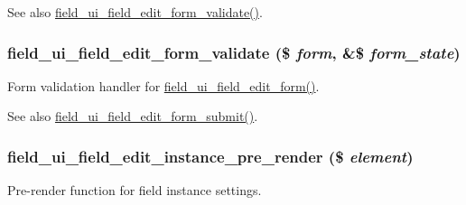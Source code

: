 \begin{DoxySeeAlso}{See also}
\hyperlink{field__ui_8admin_8inc_ae9379c6d84a3dcf100c967a8a0a0f233}{field\_\-ui\_\-field\_\-edit\_\-form\_\-validate()}. 
\end{DoxySeeAlso}
\hypertarget{field__ui_8admin_8inc_ae9379c6d84a3dcf100c967a8a0a0f233}{
\subsubsection[{field\_\-ui\_\-field\_\-edit\_\-form\_\-validate}]{\setlength{\rightskip}{0pt plus 5cm}field\_\-ui\_\-field\_\-edit\_\-form\_\-validate (\$ {\em form}, \/  \&\$ {\em form\_\-state})}}
\label{field__ui_8admin_8inc_ae9379c6d84a3dcf100c967a8a0a0f233}
Form validation handler for \hyperlink{group__forms_ga11660e91b3649ff30bf665c00f1a9af2}{field\_\-ui\_\-field\_\-edit\_\-form()}.

\begin{DoxySeeAlso}{See also}
\hyperlink{field__ui_8admin_8inc_a0d4cacca76203d4d7506dedc4781018e}{field\_\-ui\_\-field\_\-edit\_\-form\_\-submit()}. 
\end{DoxySeeAlso}
\hypertarget{field__ui_8admin_8inc_a373285bb6132ddc8934b459d5fe70f7e}{
\subsubsection[{field\_\-ui\_\-field\_\-edit\_\-instance\_\-pre\_\-render}]{\setlength{\rightskip}{0pt plus 5cm}field\_\-ui\_\-field\_\-edit\_\-instance\_\-pre\_\-render (\$ {\em element})}}
\label{field__ui_8admin_8inc_a373285bb6132ddc8934b459d5fe70f7e}
Pre-\/render function for field instance settings.

